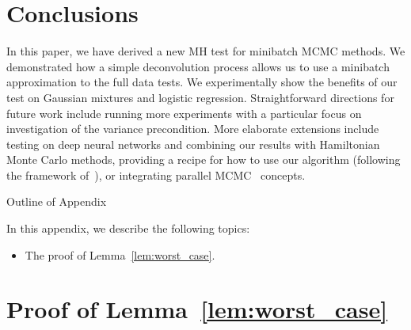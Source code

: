 \documentclass{article}
\begin{document}
\section{Conclusions}\label{sec:conclusion}

In this paper, we have derived a new MH test for minibatch MCMC methods. We
demonstrated how a simple deconvolution process allows us to use a minibatch
approximation to the full data tests. We experimentally show the benefits of our
test on Gaussian mixtures and logistic regression.  Straightforward directions
for future work include running more experiments with a particular focus on
investigation of the variance precondition.  More elaborate extensions include
testing on deep neural networks and combining our results with Hamiltonian Monte
Carlo methods, providing a recipe for how to use our algorithm (following the
framework of~\cite{sgmcmc_2015}), or integrating parallel
MCMC~\cite{conf/uai/AngelinoKWSA14,conf/icml/AhnSW14} concepts.


\small


\normalsize

\clearpage
\appendix

\begin{center}
{\Large Outline of Appendix}
\end{center}

In this appendix, we describe the following topics:

\begin{itemize}[noitemsep]
    \item The proof of Lemma~\ref{lem:worst_case}.
\end{itemize}

\section{Proof of Lemma~\ref{lem:worst_case}}\label{app:worst_case_proof}
\end{document}
